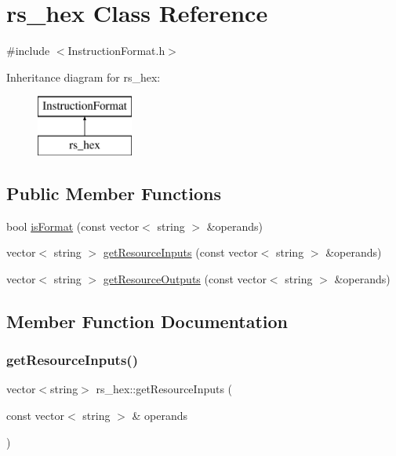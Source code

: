 \hypertarget{classrs__hex}{}\section{rs\+\_\+hex Class Reference}
\label{classrs__hex}


{\ttfamily \#include $<$Instruction\+Format.\+h$>$}

Inheritance diagram for rs\+\_\+hex\+:\begin{figure}[H]
\begin{center}
\leavevmode
\includegraphics[height=2.000000cm]{classrs__hex}
\end{center}
\end{figure}
\subsection*{Public Member Functions}
\begin{DoxyCompactItemize}
\item 
bool \hyperlink{classrs__hex_abd5955b23a014a84f32125fb9d6a75c8}{is\+Format} (const vector$<$ string $>$ \&operands)
\item 
vector$<$ string $>$ \hyperlink{classrs__hex_a98b9ec3e52203665ad8375d9cd01e17f}{get\+Resource\+Inputs} (const vector$<$ string $>$ \&operands)
\item 
vector$<$ string $>$ \hyperlink{classrs__hex_a7b4f63e180c5641a65037eff96b339f0}{get\+Resource\+Outputs} (const vector$<$ string $>$ \&operands)
\end{DoxyCompactItemize}


\subsection{Member Function Documentation}
\mbox{\label{classrs__hex_a98b9ec3e52203665ad8375d9cd01e17f}} 
\subsubsection{\texorpdfstring{get\+Resource\+Inputs()}{getResourceInputs()}}
{\footnotesize\ttfamily vector$<$string$>$ rs\+\_\+hex\+::get\+Resource\+Inputs (\begin{DoxyParamCaption}\item[{const vector$<$ string $>$ \&}]{operands }\end{DoxyParamCaption})\hspace{0.3cm}{\ttfamily [virtual]}}

